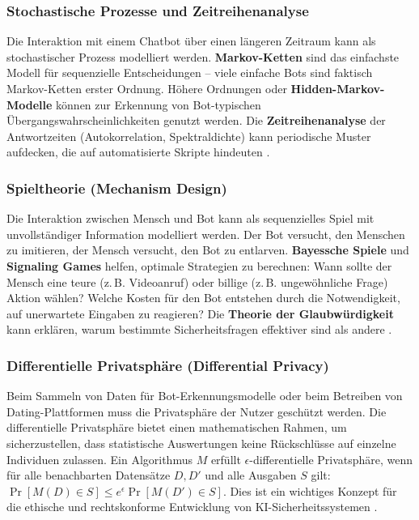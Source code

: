 \documentclass[12pt,a4paper,oneside]{scrartcl}
\begin{document}
	\subsubsection{Stochastische Prozesse und Zeitreihenanalyse}
	Die Interaktion mit einem Chatbot über einen längeren Zeitraum kann als stochastischer Prozess modelliert werden. \textbf{Markov-Ketten} sind das einfachste Modell für sequenzielle Entscheidungen – viele einfache Bots sind faktisch Markov-Ketten erster Ordnung. Höhere Ordnungen oder \textbf{Hidden-Markov-Modelle} können zur Erkennung von Bot-typischen Übergangswahrscheinlichkeiten genutzt werden. Die \textbf{Zeitreihenanalyse} der Antwortzeiten (Autokorrelation, Spektraldichte) kann periodische Muster aufdecken, die auf automatisierte Skripte hindeuten \cite{BoxJenkins}.
	
	\subsubsection{Spieltheorie (Mechanism Design)}
	Die Interaktion zwischen Mensch und Bot kann als sequenzielles Spiel mit unvollständiger Information modelliert werden. Der Bot versucht, den Menschen zu imitieren, der Mensch versucht, den Bot zu entlarven. \textbf{Bayessche Spiele} und \textbf{Signaling Games} helfen, optimale Strategien zu berechnen: Wann sollte der Mensch eine teure (z.\,B. Videoanruf) oder billige (z.\,B. ungewöhnliche Frage) Aktion wählen? Welche Kosten für den Bot entstehen durch die Notwendigkeit, auf unerwartete Eingaben zu reagieren? Die \textbf{Theorie der Glaubwürdigkeit} kann erklären, warum bestimmte Sicherheitsfragen effektiver sind als andere \cite{FudenbergTirole1991}.
	
	\subsubsection{Differentielle Privatsphäre (Differential Privacy)}
	Beim Sammeln von Daten für Bot-Erkennungsmodelle oder beim Betreiben von Dating-Plattformen muss die Privatsphäre der Nutzer geschützt werden. Die differentielle Privatsphäre bietet einen mathematischen Rahmen, um sicherzustellen, dass statistische Auswertungen keine Rückschlüsse auf einzelne Individuen zulassen. Ein Algorithmus $M$ erfüllt $\epsilon$-differentielle Privatsphäre, wenn für alle benachbarten Datensätze $D, D'$ und alle Ausgaben $S$ gilt: $\Pr[M(D) \in S] \leq e^\epsilon \Pr[M(D') \in S]$. Dies ist ein wichtiges Konzept für die ethische und rechtskonforme Entwicklung von KI-Sicherheitssystemen \cite{DworkRoth2014}.
	
\end{document}
